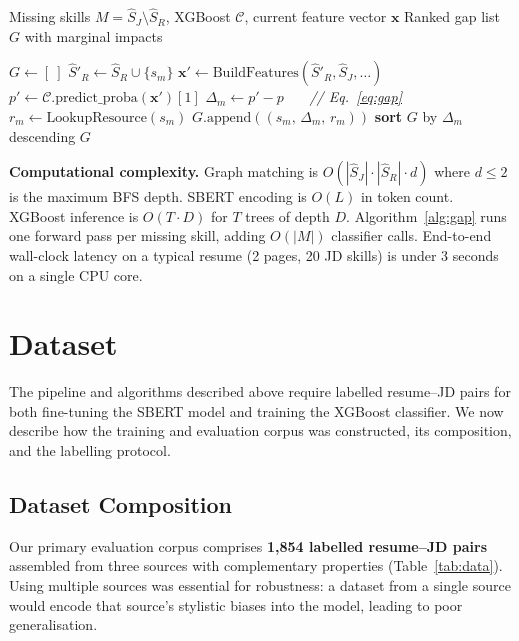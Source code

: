 \documentclass[conference]{IEEEtran}
\begin{document}
\begin{algorithm}[htbp]
\caption{Skill Gap Analyser (L6)}
\label{alg:gap}
\begin{algorithmic}[1]
\REQUIRE Missing skills $M = \hat{S}_J \setminus \hat{S}_R$,
         XGBoost $\mathcal{C}$, current feature vector $\mathbf{x}$
\ENSURE Ranked gap list $G$ with marginal impacts

\STATE $G \leftarrow [~]$
  \STATE $\hat{S}'_R \leftarrow \hat{S}_R \cup \{s_m\}$
  \STATE $\mathbf{x}' \leftarrow \text{BuildFeatures}(\hat{S}'_R, \hat{S}_J, \ldots)$
  \STATE $p' \leftarrow \mathcal{C}.\text{predict\_proba}(\mathbf{x}')[1]$
  \STATE $\Delta_m \leftarrow p' - p$
         ~~~\textit{// Eq.~\ref{eq:gap}}
  \STATE $r_m \leftarrow \text{LookupResource}(s_m)$
  \STATE $G.\text{append}((s_m,\, \Delta_m,\, r_m))$
\ENDFOR
\STATE \textbf{sort} $G$ by $\Delta_m$ descending
\RETURN $G$
\end{algorithmic}
\end{algorithm}

\noindent\textbf{Computational complexity.}
Graph matching is $O(|\hat{S}_J| \cdot |\hat{S}_R| \cdot d)$ where
$d \leq 2$ is the maximum BFS depth. SBERT encoding is $O(L)$ in token
count. XGBoost inference is $O(T \cdot D)$ for $T$ trees of depth $D$.
Algorithm~\ref{alg:gap} runs one forward pass per missing skill, adding
$O(|M|)$ classifier calls. End-to-end wall-clock latency on a typical
resume (2 pages, 20 JD skills) is under 3 seconds on a single CPU core.

\section{Dataset}
\label{sec:data}

The pipeline and algorithms described above require labelled resume--JD pairs
for both fine-tuning the SBERT model and training the XGBoost classifier.
We now describe how the training and evaluation corpus was constructed, its
composition, and the labelling protocol.

\subsection{Dataset Composition}

Our primary evaluation corpus comprises \textbf{1,854 labelled resume--JD
pairs} assembled from three sources with complementary properties
(Table~\ref{tab:data}). Using multiple sources was essential for robustness:
a dataset from a single source would encode that source's stylistic biases
into the model, leading to poor generalisation.
\end{document}
